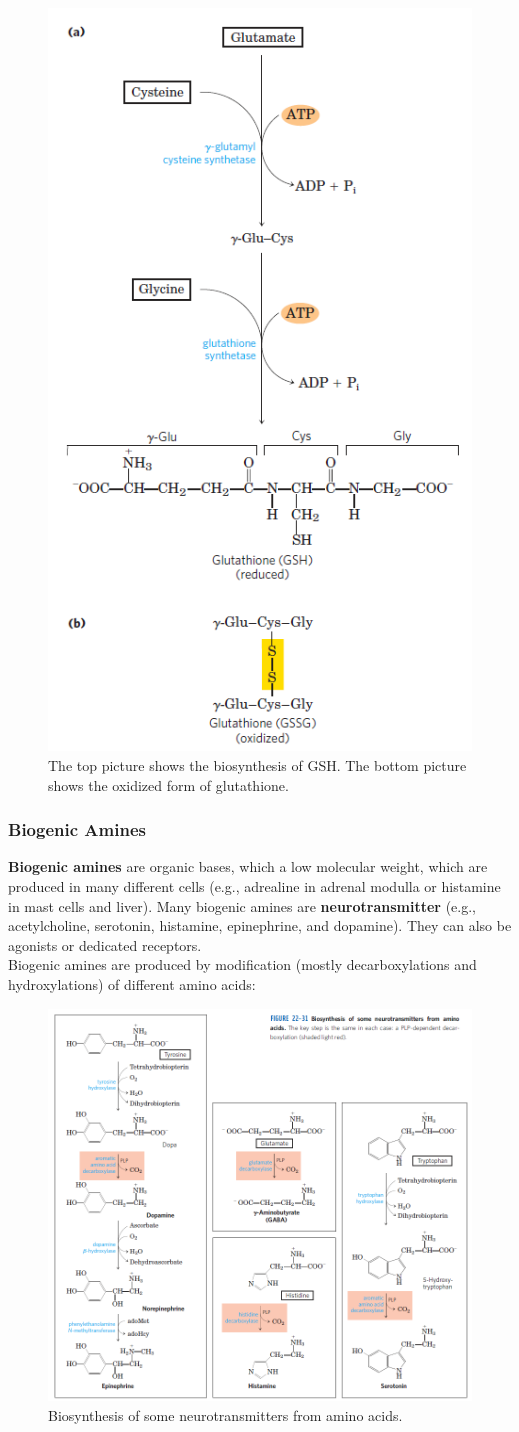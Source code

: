 \documentclass[../main.tex]{subfiles}
\begin{document}
\begin{figure}[H]
	\centering
	\includegraphics[width=0.3\linewidth]{gsh}
	\caption{The top picture shows the biosynthesis of GSH. The bottom picture shows the oxidized form of glutathione.}
	\label{fig:gsh}
\end{figure}

\subsubsection{Biogenic Amines}

\textbf{\gls{Biogenic amines}} are organic bases, which a low molecular weight, which are produced in many different cells (e.g., adrealine in adrenal modulla or histamine in mast cells and liver). Many biogenic amines are \textbf{\gls{neurotransmitter}} (e.g., acetylcholine, serotonin, histamine, epinephrine, and dopamine). They can also be agonists or dedicated receptors. \\

Biogenic amines are produced by modification (mostly decarboxylations and hydroxylations) of different amino acids:

\begin{figure}[H]
	\centering
	\includegraphics[width=0.5\linewidth]{biogenics}
	\caption{Biosynthesis of some neurotransmitters from amino acids.}
	\label{fig:biogenics}
\end{figure}
\end{document}
